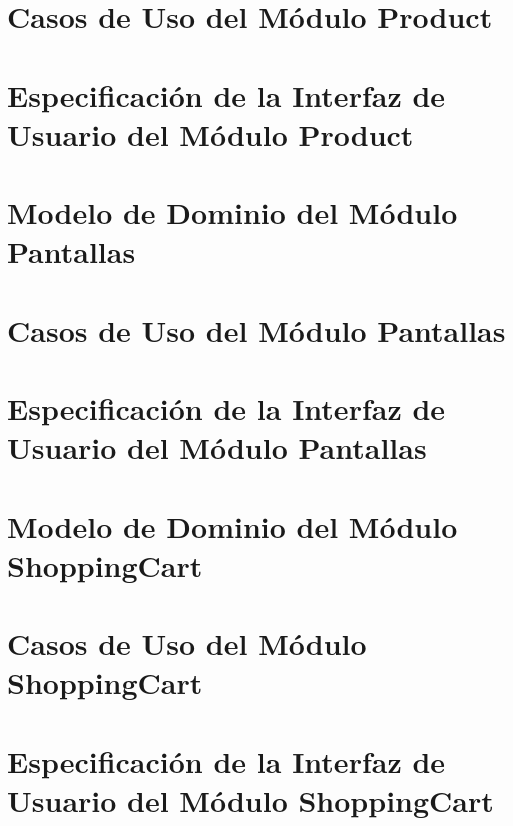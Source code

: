 \documentclass[10pt, letterpaper]{report}
\begin{document}
\chapter{Casos de Uso del M\'odulo Product}


\chapter{Especificaci\'on de la Interfaz de Usuario del M\'odulo Product}

\chapter{Modelo de Dominio del M\'odulo Pantallas}
\clearpage


\chapter{Casos de Uso del M\'odulo Pantallas}


\chapter{Especificaci\'on de la Interfaz de Usuario del M\'odulo Pantallas}

\chapter{Modelo de Dominio del M\'odulo ShoppingCart}
\clearpage


\chapter{Casos de Uso del M\'odulo ShoppingCart}


\chapter{Especificaci\'on de la Interfaz de Usuario del M\'odulo ShoppingCart}

\printglossary
\end{document}
